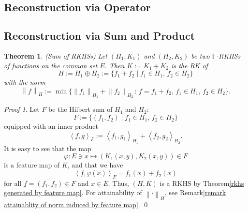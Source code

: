 \documentclass[a4paper,12pt]{article}
\newtheorem{thm}{Theorem}[section]
\theoremstyle{remark}
\newtheorem*{prf}{Proof}
\theoremstyle{definition}
\theoremstyle{definition}
\theoremstyle{definition}
\newcommand{\ip}[2]{\left<#1, #2 \right>}
\newcommand{\norm}[1]{\left\| #1 \right\|}
\begin{document}
\subsection{Reconstruction via Operator}
\subsection{Reconstruction via Sum and Product}

\begin{thm} (Sum of RKHSs)
	Let \( (H_1,K_1) \) and \( (H_2,K_2) \) be two \( \mathbb{F} \)-RKHSs of functions on the common set \( E \).
	Then \( K:= K_1 + K_2 \) is the RK of
	\begin{equation*}
		H:= H_1 \oplus H_2:= \{f_1 + f_2 \mid f_1 \in H_1, \, f_2 \in H_2\}
	\end{equation*}
	with the norm
	\begin{equation*}
		\norm{f}_H := \min \{\norm{f_1}_{H_1}+\norm{f_2}_{H_2} \,:\, f = f_1 + f_2,\,f_1 \in H_1,\,f_2 \in H_2\}.
	\end{equation*}
\end{thm}
\begin{prf}
	Let \( F \) be the Hilbert sum of \( H_1 \) and \( H_2 \):
	\begin{equation*}
		F := \{(f_1, f_2)\mid f_1 \in H_1,\, f_2 \in H_2\}
	\end{equation*}
	equipped with an inner product
	\begin{equation*}
		\ip{f}{g}_F := \ip{f_1}{g_1}_{H_1} + \ip{f_2}{g_2}_{H_2}.
	\end{equation*}
	It is easy to see that the map
	\begin{equation*}
		\varphi : E \ni x \mapsto \left( K_1(x,y), K_2(x,y) \right) \in F
	\end{equation*}
	is a feature map of \( K \), and that we have
	\begin{equation*}
		\ip{f}{\varphi(x)}_F = f_1(x)+f_2(x)
	\end{equation*}
	for all \( f = (f_1,f_2) \in F \) and \( x \in E \).
	Thus, \( (H,K) \) is a RKHS by Theorem\ref{rkhs generated by feature map}. For attainability of \( \norm{\cdot}_H \), see Remark\ref{remark attainablity of norm induced by feature map}.
	\qed\end{prf}
\end{document}
